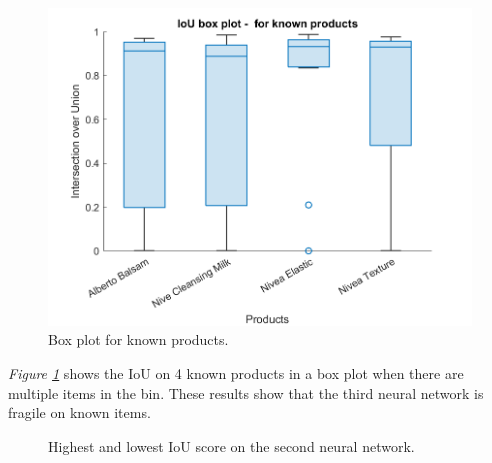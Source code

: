 \begin{figure}[h]
 \centering
 \includegraphics[width=1\textwidth]{graphics/results/v3boxplotForKnownProducts.png}
 \caption{Box plot for known products.}
 \label{fig:v3boxknownproducts}
\end{figure}
\textit{Figure \ref{fig:v3boxknownproducts}} shows the IoU on 4 known products in a box plot when there are multiple items in the bin. These results show that the third neural network is fragile on known items.

\begin{figure}[h]
 \centering
 \hspace{0.5cm}
 \caption{Highest and lowest IoU score on the second neural network.}
 \label{figure: v3bestworst}
\end{figure}

